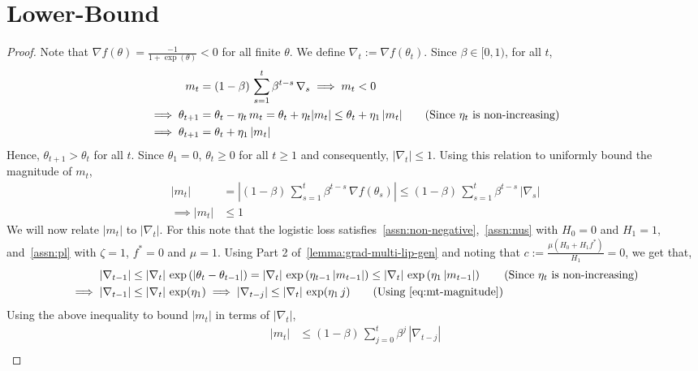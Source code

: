 \documentclass{article}
\newcommand{\tht}{\theta_t}
\newcommand{\thtt}{\theta_{t+1}}
\newcommand{\etat}{{\eta_t}}
\begin{document}
\section{Lower-Bound}
\label{app:lb}

\lb*
\begin{proof}
Note that $\nabla f(\theta) = \frac{-1}{1 + \exp(\theta)} < 0$ for all finite $\theta$. We define $\nabla_t := \nabla f(\tht)$. Since $\beta \in [0,1)$, for all $t$,   
\begin{align}
m_t & = (1-\beta) \, \sum_{s = 1}^{t} \beta^{t-s} \, \nabla_s \implies m_t < 0 \label{eq:mt-sign} \\
\implies \thtt & = \tht - \etat \, m_t = \tht + \etat | m_t | \leq \tht + \eta_1 \, |m_t| \tag{Since $\etat$ is non-increasing} \\
\implies \thtt & = \tht + \eta_1 \, |m_t| \label{eq:effective-update} 
\end{align}
Hence, $\thtt > \tht$ for all $t$. Since $\theta_1 = 0$, $\theta_t \geq 0$ for all $t \geq 1$ and consequently, $|\nabla_t| \leq 1$. Using this relation to uniformly bound the magnitude of $m_t$, 
\begin{align}
|m_t| & = |(1-\beta) \, \sum_{s = 1}^{t} \beta^{t-s} \, \nabla f(\theta_s)| \leq (1-\beta) \, \sum_{s = 1}^{t} \beta^{t-s} \, |\nabla_s| \tag{By triangle inequality} \\
\implies |m_t| & \leq 1 \label{eq:mt-magnitude}
\end{align}
We will now relate $|m_t|$ to $|\nabla_t|$. For this note that the logistic loss satisfies~\cref{assn:non-negative},~\cref{assn:nus} with $H_0 = 0$ and $H_1 = 1$, and~\cref{assn:pl} with $\zeta = 1$, $f^* = 0$ and $\mu = 1$. Using Part 2 of~\cref{lemma:grad-multi-lip-gen} and noting that $c :=\frac{\mu(H_0+H_1 f^*)}{H_1} = 0$, we get that, 
\begin{align*}
|\nabla_{t-1}| &\leq |\nabla_t| \, \exp \left( | \theta_{t} - \theta_{t-1}| \right) =  |\nabla_t| \, \exp \left( \eta_{t-1} \, |m_{t-1}| \right) \leq |\nabla_t| \, \exp \left( \eta_1 \, |m_{t-1}| \right) \tag{Since $\etat$ is non-increasing} \\
\implies |\nabla_{t-1}| &\leq |\nabla_t| \, \exp(\eta_1) \implies |\nabla_{t-j}| \leq |\nabla_t| \, \exp(\eta_1 \, j) \tag{Using~\cref{eq:mt-magnitude}}
\end{align*}
Using the above inequality to bound $|m_t|$ in terms of $|\nabla_t|$, 
\begin{align}
|m_t| & \leq (1-\beta) \, \sum_{j = 0}^{t} \beta^j \, |\nabla_{t-j}| \tag{Using the definition of $m_t$ and triangle inequality} \\

\end{align}
\end{proof}
\end{document}
